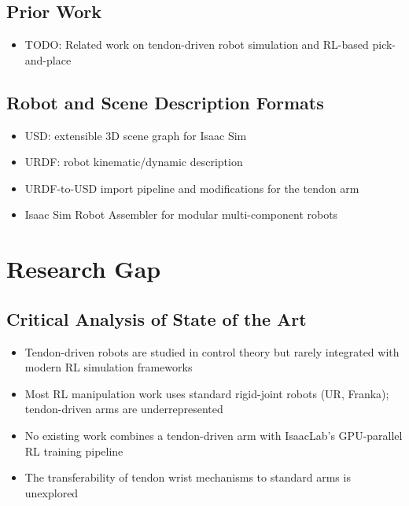 \section{Prior Work}
\begin{itemize}
    \item TODO: Related work on tendon-driven robot simulation and RL-based pick-and-place
\end{itemize}

\section{Robot and Scene Description Formats}
\begin{itemize}
    \item USD: extensible 3D scene graph for Isaac Sim
    \item URDF: robot kinematic/dynamic description
    \item URDF-to-USD import pipeline and modifications for the tendon arm
    \item Isaac Sim Robot Assembler for modular multi-component robots
\end{itemize}

\chapter{Research Gap}\label{ch:research_gap}

\section{Critical Analysis of State of the Art}
\begin{itemize}
    \item Tendon-driven robots are studied in control theory but rarely integrated with modern RL simulation frameworks
    \item Most RL manipulation work uses standard rigid-joint robots (UR, Franka); tendon-driven arms are underrepresented
    \item No existing work combines a tendon-driven arm with IsaacLab's GPU-parallel RL training pipeline
    \item The transferability of tendon wrist mechanisms to standard arms is unexplored
\end{itemize}

